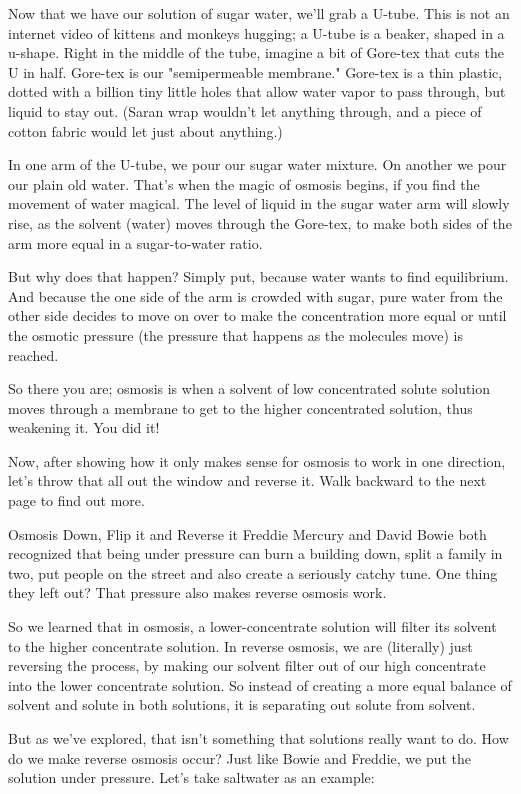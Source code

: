 Now that we have our solution of sugar water, we'll grab a U-tube. This is not an internet video of kittens and monkeys hugging; a U-tube is a beaker, shaped in a u-shape. Right in the middle of the tube, imagine a bit of Gore-tex that cuts the U in half. Gore-tex is our "semipermeable membrane." Gore-tex is a thin plastic, dotted with a billion tiny little holes that allow water vapor to pass through, but liquid to stay out. (Saran wrap wouldn't let anything through, and a piece of cotton fabric would let just about anything.)

In one arm of the U-tube, we pour our sugar water mixture. On another we pour our plain old water. That's when the magic of osmosis begins, if you find the movement of water magical. The level of liquid in the sugar water arm will slowly rise, as the solvent (water) moves through the Gore-tex, to make both sides of the arm more equal in a sugar-to-water ratio.

But why does that happen? Simply put, because water wants to find equilibrium. And because the one side of the arm is crowded with sugar, pure water from the other side decides to move on over to make the concentration more equal or until the osmotic pressure (the pressure that happens as the molecules move) is reached.

So there you are; osmosis is when a solvent of low concentrated solute solution moves through a membrane to get to the higher concentrated solution, thus weakening it. You did it!

Now, after showing how it only makes sense for osmosis to work in one direction, let's throw that all out the window and reverse it. Walk backward to the next page to find out more.

Osmosis Down, Flip it and Reverse it
Freddie Mercury and David Bowie both recognized that being under pressure can burn a building down, split a family in two, put people on the street and also create a seriously catchy tune. One thing they left out? That pressure also makes reverse osmosis work.

So we learned that in osmosis, a lower-concentrate solution will filter its solvent to the higher concentrate solution. In reverse osmosis, we are (literally) just reversing the process, by making our solvent filter out of our high concentrate into the lower concentrate solution. So instead of creating a more equal balance of solvent and solute in both solutions, it is separating out solute from solvent.

But as we've explored, that isn't something that solutions really want to do. How do we make reverse osmosis occur? Just like Bowie and Freddie, we put the solution under pressure. Let's take saltwater as an example:

